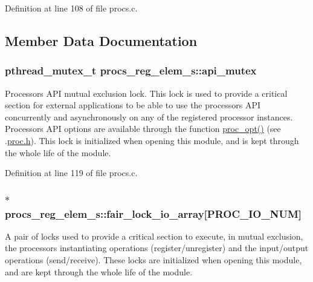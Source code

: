 Definition at line 108 of file procs.\+c.



\subsection{Member Data Documentation}
\subsubsection[{\texorpdfstring{api\+\_\+mutex}{api_mutex}}]{\setlength{\rightskip}{0pt plus 5cm}pthread\+\_\+mutex\+\_\+t procs\+\_\+reg\+\_\+elem\+\_\+s\+::api\+\_\+mutex}\hypertarget{structprocs__reg__elem__s_a9b7bb6d12868ba74184d95f1a2fdd2ab}{}\label{structprocs__reg__elem__s_a9b7bb6d12868ba74184d95f1a2fdd2ab}
Processor\textquotesingle{}s A\+PI mutual exclusion lock. This lock is used to provide a critical section for external applications to be able to use the processor\textquotesingle{}s A\+PI concurrently and asynchronously on any of the registered processor instances. Processor\textquotesingle{}s A\+PI options are available through the function \hyperlink{proc_8c_a0367a65712bcd2e762ec1e9e3035cb3b}{proc\+\_\+opt()} (see .\hyperlink{proc_8h}{proc.\+h}). This lock is initialized when opening this module, and is kept through the whole life of the module. 

Definition at line 119 of file procs.\+c.

\subsubsection[{\texorpdfstring{fair\+\_\+lock\+\_\+io\+\_\+array}{fair_lock_io_array}}]{$\ast$ procs\+\_\+reg\+\_\+elem\+\_\+s\+::fair\+\_\+lock\+\_\+io\+\_\+array\mbox{[}P\+R\+O\+C\+\_\+\+I\+O\+\_\+\+N\+UM\mbox{]}}\hypertarget{structprocs__reg__elem__s_a4de246450a9e79fe65ab600814311c6d}{}\label{structprocs__reg__elem__s_a4de246450a9e79fe65ab600814311c6d}
A pair of locks used to provide a critical section to execute, in mutual exclusion, the processor\textquotesingle{}s instantiating operations (register/unregister) and the input/output operations (send/receive). These locks are initialized when opening this module, and are kept through the whole life of the module. 


